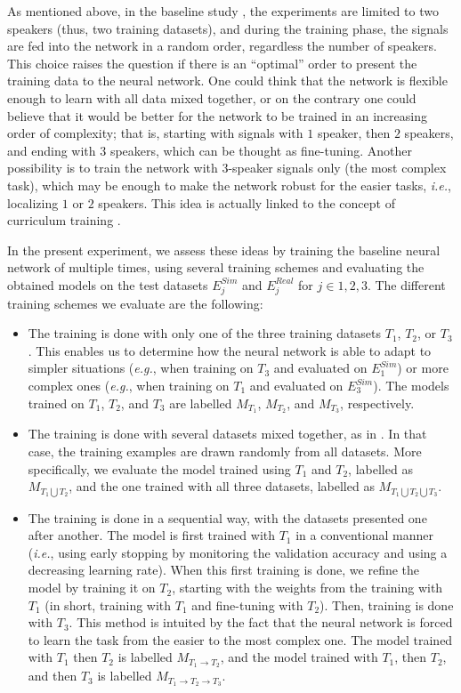 As mentioned above, in the baseline study \cite{perotin_crnn-based_2019}, the experiments are limited to two speakers (thus, two training datasets), and during the training phase, the signals are fed into the network in a random order, regardless the number of speakers. This choice raises the question if there is an ``optimal'' order to present the training data to the neural network. One could think that the network is flexible enough to learn with all data mixed together, or on the contrary one could believe that it would be better for the network to be trained in an increasing order of complexity; that is, starting with signals with $1$ speaker, then $2$ speakers, and ending with $3$ speakers, which can be thought as fine-tuning. Another possibility is to train the network with $3$-speaker signals only (the most complex task), which may be enough to make the network robust for the easier tasks, \emph{i.e.}, localizing $1$ or $2$ speakers. This idea is actually linked to the concept of curriculum training \cite{bengio_curriculum_2009,jiang_self-paced_2015}.

In the present experiment, we assess these ideas by training the baseline neural network of \cite{perotin_crnn-based_2019} multiple times, using several training schemes and evaluating the obtained models on the test datasets $E^{Sim}_j$ and $E^{Real}_j$ for $j \in {1,2,3}$. The different training schemes we evaluate are the following:
\begin{itemize}
    \item The training is done with only one of the three training datasets $T_1$, $T_2$, or $T_3$. This enables us to determine how the neural network is able to adapt to simpler situations (\emph{e.g.}, when training on $T_3$ and evaluated on $E^{Sim}_1$) or more complex ones (\emph{e.g.}, when training on $T_1$ and evaluated on $E^{Sim}_3$). The models trained on $T_1$, $T_2$, and $T_3$ are labelled $M_{T_1}$, $M_{T_2}$, and $M_{T_3}$, respectively.
    \item The training is done with several datasets mixed together, as in \cite{perotin_crnn-based_2019}. In that case, the training examples are drawn randomly from all datasets. More specifically, we evaluate the model trained using $T_1$ and $T_2$, labelled as $M_{T_1 \bigcup T_2}$, and the one trained with all three datasets, labelled as $M_{T_1 \bigcup T_2 \bigcup T_3}$.
    \item The training is done in a sequential way, with the datasets presented one after another. The model is first trained with $T_1$ in a conventional manner (\emph{i.e.}, using early stopping by monitoring the validation accuracy and using a decreasing learning rate). When this first training is done, we refine the model by training it on $T_2$, starting with the weights from the training with $T_1$ (in short, training with $T_1$ and fine-tuning with $T_2$). Then, training is done with $T_3$. This method is intuited by the fact that the neural network is forced to learn the task from the easier to the most complex one. The model trained with $T_1$ then $T_2$ is labelled $M_{T_1 \rightarrow T_2}$, and the model trained with $T_1$, then $T_2$, and then $T_3$ is labelled $M_{T_1 \rightarrow T_2 \rightarrow T_3}$.
\end{itemize}

